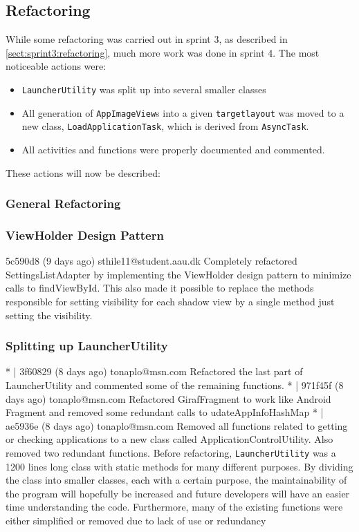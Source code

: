\subsection{Refactoring}\label{sect:sprint4:refactoring}
While some refactoring was carried out in sprint 3, as described in \cref{sect:sprint3:refactoring}, much more work was done in sprint 4.
The most noticeable actions were:
\begin{itemize}
\item \lstinline!LauncherUtility! was split up into several smaller classes
\item All generation of \lstinline!AppImageView!s into a given \lstinline!targetlayout! was moved to a new class, \lstinline!LoadApplicationTask!, which is derived from \lstinline!AsyncTask!.
\item All activities and functions were properly documented and commented. 
\end{itemize}

These actions will now be described:

\subsubsection{General Refactoring}

\subsubsection{ViewHolder Design Pattern}
5c590d8 (9 days ago) sthile11@student.aau.dk Completely refactored SettingsListAdapter by implementing the ViewHolder design pattern to minimize calls to findViewById. This also made it possible to replace the methods responsible for setting visibility for each shadow view by a single method just setting the visibility.
 
\subsubsection{Splitting up LauncherUtility}
* | 3f60829 (8 days ago) tonaplo@msn.com Refactored the last part of LauncherUtility and commented some of the remaining functions.
* | 971f45f (8 days ago) tonaplo@msn.com Refactored GirafFragment to work like Android Fragment and removed some redundant calls to udateAppInfoHashMap
* | ae5936e (8 days ago) tonaplo@msn.com Removed all functions related to getting or checking applications to a new class called ApplicationControlUtility. Also removed two redundant functions.
Before refactoring, \lstinline!LauncherUtility! was  a 1200 lines long class with static methods for many different purposes.
By dividing the class into smaller classes, each with a certain purpose, the maintainability of the program will hopefully be increased and future developers will have an easier time understanding the code.
Furthermore, many of the existing functions were either simplified or removed due to lack of use or redundancy